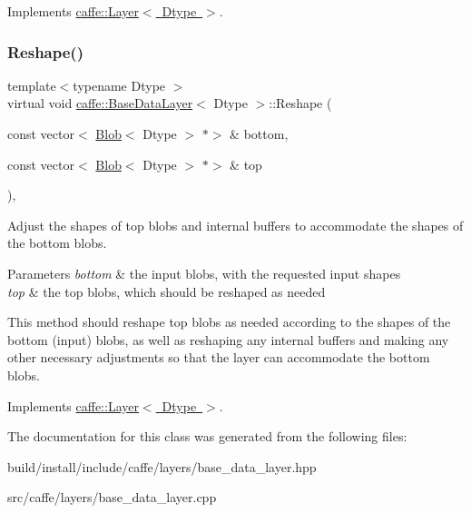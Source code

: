 Implements \mbox{\hyperlink{classcaffe_1_1_layer_a7fe981e8af8d93d587acf2a952be563d}{caffe\+::\+Layer$<$ Dtype $>$}}.

\mbox{\label{classcaffe_1_1_base_data_layer_a2955d06a5e67609582fb293a0a37673f}} 
\subsubsection{\texorpdfstring{Reshape()}{Reshape()}\hspace{0.1cm}{\footnotesize\ttfamily [2/2]}}
{\footnotesize\ttfamily template$<$typename Dtype $>$ \\
virtual void \mbox{\hyperlink{classcaffe_1_1_base_data_layer}{caffe\+::\+Base\+Data\+Layer}}$<$ Dtype $>$\+::Reshape (\begin{DoxyParamCaption}\item[{const vector$<$ \mbox{\hyperlink{classcaffe_1_1_blob}{Blob}}$<$ Dtype $>$ $\ast$$>$ \&}]{bottom,  }\item[{const vector$<$ \mbox{\hyperlink{classcaffe_1_1_blob}{Blob}}$<$ Dtype $>$ $\ast$$>$ \&}]{top }\end{DoxyParamCaption})\hspace{0.3cm}{\ttfamily [inline]}, {\ttfamily [virtual]}}



Adjust the shapes of top blobs and internal buffers to accommodate the shapes of the bottom blobs. 


\begin{DoxyParams}{Parameters}
{\em bottom} & the input blobs, with the requested input shapes \\
\hline
{\em top} & the top blobs, which should be reshaped as needed\\
\hline
\end{DoxyParams}
This method should reshape top blobs as needed according to the shapes of the bottom (input) blobs, as well as reshaping any internal buffers and making any other necessary adjustments so that the layer can accommodate the bottom blobs. 

Implements \mbox{\hyperlink{classcaffe_1_1_layer_a7fe981e8af8d93d587acf2a952be563d}{caffe\+::\+Layer$<$ Dtype $>$}}.



The documentation for this class was generated from the following files\+:\begin{DoxyCompactItemize}
\item 
build/install/include/caffe/layers/base\+\_\+data\+\_\+layer.\+hpp\item 
src/caffe/layers/base\+\_\+data\+\_\+layer.\+cpp\end{DoxyCompactItemize}
